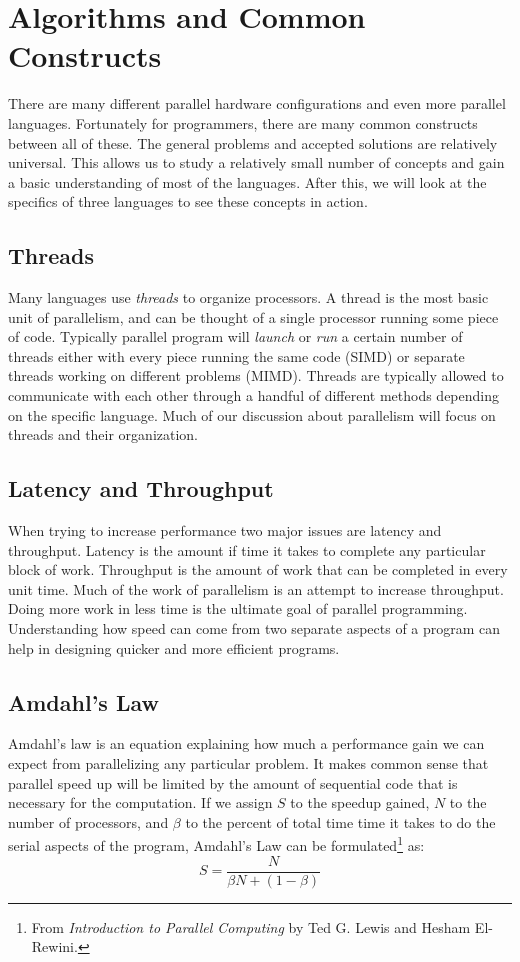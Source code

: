 \documentclass{article}
\begin{document}
  \section{Algorithms and Common Constructs}
  There are many different parallel hardware configurations and even more parallel languages. Fortunately for programmers, there are many common constructs between all of these. The general problems and accepted solutions are relatively universal. This allows us to study a relatively small number of concepts and gain a basic understanding of most of the languages. After this, we will look at the specifics of three languages to see these concepts in action.
	\subsection{Threads}
	Many languages use \emph{threads} to organize processors. A thread is the most basic unit of parallelism, and can be thought of a single processor running some piece of code. Typically parallel program will \emph{launch} or \emph{run} a certain number of threads either with every piece running the same code (SIMD) or separate threads working on different problems (MIMD). Threads are typically allowed to communicate with each other through a handful of different methods depending on the specific language. Much of our discussion about parallelism will focus on threads and their organization.
	
	\subsection{Latency and Throughput}
    When trying to increase performance two major issues are latency and throughput. Latency is the amount if time it takes to complete any particular block of work. Throughput is the amount of work that can be completed in every unit time.  Much of the work of parallelism is an attempt to increase throughput. Doing more work in less time is the ultimate goal of parallel programming. Understanding how speed can come from two separate aspects of a program can help in designing quicker and more efficient programs.
	
	\subsection{Amdahl's Law}
    Amdahl's law is an equation explaining how much a performance gain we can expect from parallelizing any particular problem. It makes common sense that parallel speed up will be limited by the amount of sequential code that is necessary for the computation. If we assign $S$ to the speedup gained, $N$ to the number of processors, and $\beta$ to the percent of total time time it takes to do the serial aspects of the program, Amdahl's Law can be formulated\footnote{From {\it Introduction to Parallel Computing} by Ted G. Lewis and Hesham El-Rewini.} as:
    $$S=\frac{N}{\beta N+(1-\beta)}$$
\end{document}
